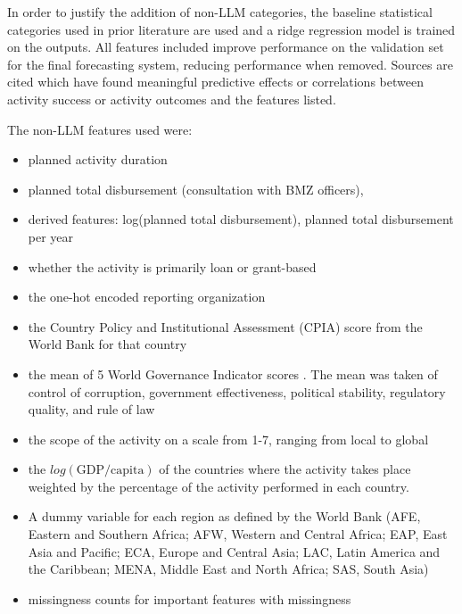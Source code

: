 In order to justify the addition of non-LLM categories, the baseline statistical categories used in prior literature are used and a ridge regression model is trained on the outputs. All features included improve performance on the validation set for the final forecasting system, reducing performance when removed. Sources are cited which have found meaningful predictive effects or correlations between activity success or activity outcomes and the features listed.

The non-LLM features used were:
\begin{itemize}[noitemsep,topsep=0pt]
 \item planned activity duration \citep{goldembergMindingGapAid2025} %
 \item planned total disbursement (consultation with BMZ officers), \citep{bulmanGoodCountriesGood2017} \citep{goldembergMindingGapAid2025} \citep{ashtonPuzzleMissingPieces2021} \citep{eilersVolumeRiskComplexitya}
 \item derived features: log(planned total disbursement), planned total disbursement per year 
 \item whether the activity is primarily loan or grant-based \citep{bulmanGoodCountriesGood2017}
 \item the one-hot encoded reporting organization \citep{goldembergMindingGapAid2025} %
 \item the Country Policy and Institutional Assessment (CPIA) score from the World Bank for that country \citep{bulmanGoodCountriesGood2017} 
 \item the mean of 5 World Governance Indicator scores \citep{kaufmannWorldwideGovernanceIndicators2024}. The mean was taken of control of corruption, government effectiveness, political stability, regulatory quality, and rule of law \citep{goldembergMindingGapAid2025} \citep{ndikumanaImpactForeignAid2017}
 \item the scope of the activity on a scale from 1-7, ranging from local to global \citep{vivaltHowMuchCan2020}
 \item the $log(\text{GDP} / \text{capita})$ of the countries where the activity takes place weighted by the percentage of the activity performed in each country. \citep{goldembergMindingGapAid2025} \citep{bulmanGoodCountriesGood2017}
\item A dummy variable for each region as defined by the World Bank (AFE, Eastern and Southern Africa; AFW, Western and Central Africa; EAP, East Asia and Pacific; ECA, Europe and Central Asia; LAC, Latin America and the Caribbean; MENA, Middle East and North Africa; SAS, South Asia) \citep{goldembergMindingGapAid2025} \citep{vivaltHowMuchCan2020}
\item  missingness counts for important features with missingness
\end{itemize}


